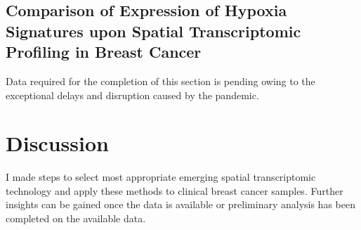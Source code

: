 \subsection{Comparison of Expression of Hypoxia Signatures upon Spatial Transcriptomic Profiling in Breast Cancer}
Data required for the completion of this section is pending owing to the exceptional delays and disruption caused by the pandemic. 

\section{Discussion}
I made steps to select most appropriate emerging spatial transcriptomic technology and apply these methods to clinical breast cancer samples. 
Further insights can be gained once the data is available or preliminary analysis has been completed on the available data.


